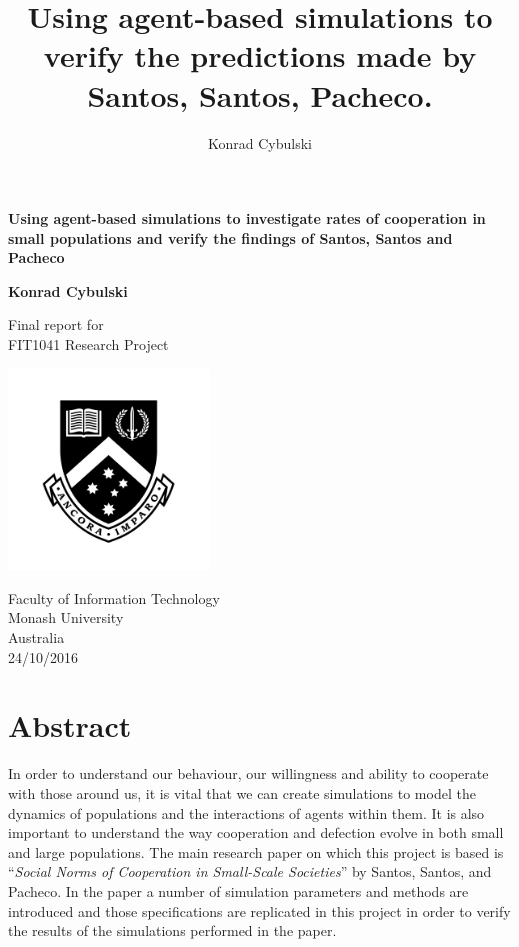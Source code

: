 \documentclass[10pt,a4paper]{article}
\author{Konrad Cybulski}
\title{Using agent-based simulations to verify the predictions made by Santos, Santos, Pacheco.}
\begin{document}
\begin{titlepage}
    \begin{center}
        \vspace*{1cm}
        
        \LARGE
        \textbf{Using agent-based simulations to investigate rates of cooperation in small populations and verify the findings of Santos, Santos and Pacheco}
        
        \vspace{2cm}
        \Large
        
        \textbf{Konrad Cybulski}
        
        \vfill
        
        Final report for\\
        FIT1041 Research Project
        
        \vspace{0.8cm}
        
        \includegraphics[width=0.4\textwidth]{monash_emblem.jpg}
        
        \large
        Faculty of Information Technology\\
        Monash University\\
        Australia\\
        24/10/2016
        
    \end{center}
\end{titlepage}

\begin{Large}

\end{Large}

\pagebreak
\tableofcontents
\pagebreak

\section{Abstract}
In order to understand our behaviour, our willingness and ability to cooperate with those around us, it is vital that we can create simulations to model the dynamics of populations and the interactions of agents within them.
It is also important to understand the way cooperation and defection evolve in both small and large populations.
The main research paper on which this project is based is “\textit{Social Norms of Cooperation in Small-Scale Societies}” by Santos, Santos, and Pacheco. 
In the paper a number of simulation parameters and methods are introduced and those specifications are replicated in this project in order to verify the results of the simulations performed in the paper.
\end{document}
